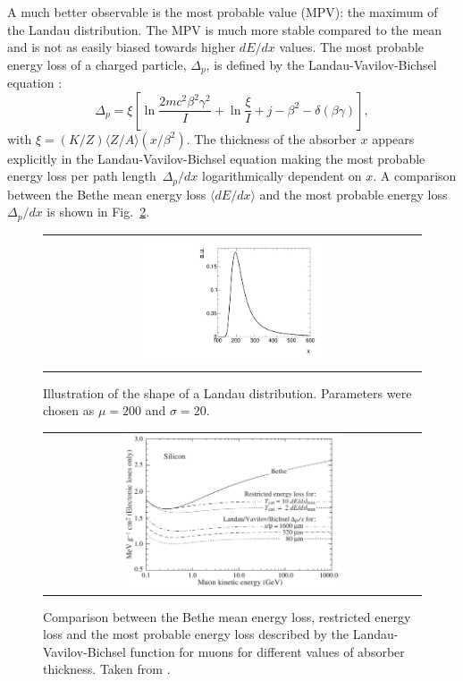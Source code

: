 A much better observable is the most probable value (MPV): the maximum of the Landau distribution.
The MPV is much more stable compared to the mean and is not as easily biased towards higher $dE/dx$ values. 
The most probable energy loss of a charged particle, $\Delta_p$, is defined by the Landau-Vavilov-Bichsel equation \cite{bib:Bichsel:MPV_1988}:
\begin{equation}
\Delta_p = \xi \left[ \ln \frac{2mc^2\beta^2\gamma^2}{I}  + \ln\frac{\xi}{I} + j - \beta^2 - \delta(\beta\gamma)  \right],
\label{eq:Landau_Vavilov_Bichsel}
\end{equation}
with $\xi=(K/Z)\langle Z/A \rangle (x/\beta^2)$. 
The thickness of the absorber $x$ appears explicitly in the Landau-Vavilov-Bichsel equation making the most probable energy loss per path \mbox{length $\Delta_p/dx$} logarithmically dependent on $x$.
A comparison between the Bethe mean energy loss $\langle dE/dx \rangle$ and the most probable energy loss $\Delta_p/dx$ is shown in Fig.~\ref{fig:dEdx_Bethe_Landau}.
\begin{figure}[!b]
  \centering 
  \begin{tabular}{c}
  \includegraphics[width=0.49\textwidth]{figures/analysis/PixelCalibration/Landau.pdf}
  \end{tabular}
  \caption{Illustration of the shape of a Landau distribution. Parameters were chosen as $\mu=200$ and $\sigma=20$.} 
  \label{fig:landau}
\vspace{92pt}
\end{figure}
\begin{figure}[!bt]
  \centering 
  \begin{tabular}{c}
  \includegraphics[width=0.6\textwidth]{figures/analysis/dEdx_Bethe_Landau.png}
  \end{tabular}
  \caption{Comparison between the Bethe mean energy loss, restricted energy loss and the most probable energy loss described by the Landau-Vavilov-Bichsel function for muons for different values of absorber thickness. 
           Taken from \cite{bib:PDG_2014}.} 
  \label{fig:dEdx_Bethe_Landau}
\end{figure}
